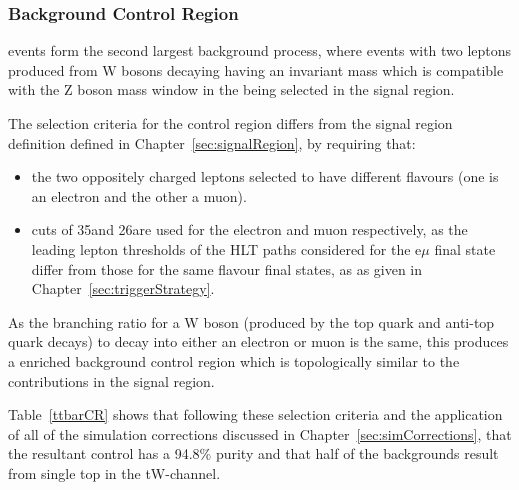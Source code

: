 \subsubsection{\ttbar Background Control Region}\label{subsec:ttbarCR}
\ttbar events form the second largest background process, where events with two leptons produced from W bosons decaying having an invariant mass which is compatible with the Z boson mass window in the being selected in the signal region.

The selection criteria for the \ttbar control region differs from the signal region definition defined in Chapter~\ref{sec:signalRegion}, by requiring that:
\begin{itemize}
\item the two oppositely charged leptons selected to have different flavours (\ie one is an electron and the other a muon).
\item \pt cuts of 35\GeV and 26\GeV are used for the electron and muon respectively, as the leading lepton \pt thresholds of the HLT paths considered for the e$\mu$ final state differ from those for the same flavour final states, as as given in Chapter~\ref{sec:triggerStrategy}. 
\end{itemize} 

As the branching ratio for a W boson (produced by the top quark and anti-top quark decays) to decay into either an electron or muon is the same, this produces a \ttbar enriched background control region which is topologically similar to the \ttbar contributions in the signal region. 

Table~\ref{ttbarCR} shows that following these selection criteria and the application of all of the simulation corrections discussed in Chapter~\ref{sec:simCorrections}, that the resultant control has a 94.8\% purity and that half of the backgrounds result from single top in the tW-channel.

